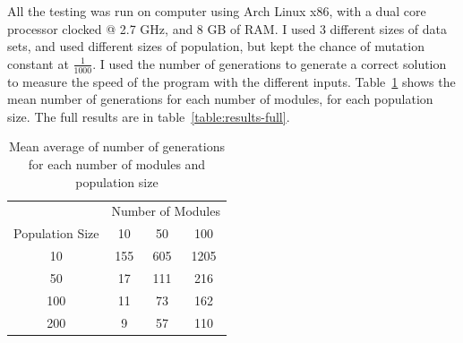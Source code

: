All the testing was run on computer using Arch Linux x86, with 
a dual core processor clocked @ 2.7 GHz, and 8 GB of RAM.
I used 3 different sizes of data sets, and used different sizes of population, 
but kept the chance of mutation constant at \( \frac{1}{1000} \).
I used the number of generations to generate a correct solution to measure the
speed of the program with the different inputs.
Table~\ref*{table:results-mean} shows the mean number of generations for each
number of modules, for each population size.
The full results are in table~\ref*{table:results-full}.

\begin{table}[ht]
	\centering
	\begin{tabular}{c|ccc}
		\toprule
		& \multicolumn{3}{c}{Number of Modules} \\
		Population Size & 10 & 50 & 100 \\
		\midrule
		10 & 155 & 605 & 1205 \\
		50 & 17 & 111 & 216 \\
		100 & 11 & 73 & 162 \\
		200 & 9 & 57 & 110 \\
		\bottomrule
	\end{tabular}
	\caption{Mean average of number of generations for each number of modules
		and population size}
	\label{table:results-mean}
\end{table}

